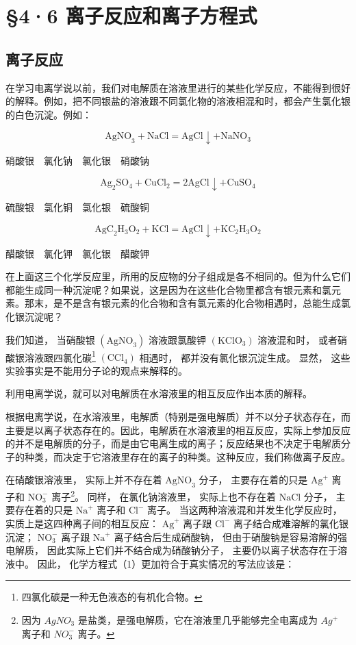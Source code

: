 \section{§4·6 离子反应和离子方程式}

\subsection{离子反应}

在学习电离学说以前，我们对电解质在溶液里进行的某些化学反应，不能得到很好的解释。例如，把不同银盐的溶液跟不同氯化物的溶液相混和时，都会产生氯化银的白色沉淀。例如：

\[
\mathrm{AgNO} _ {3} + \mathrm{NaCl} = \mathrm{AgCl} \downarrow + \mathrm{NaNO} _ {3} \tag {1}
\]

硝酸银　氯化钠　氯化银　硝酸钠

\[
\mathrm{Ag} _ {2} \mathrm{SO} _ {4} + \mathrm{CuCl} _ {2} = 2 \mathrm{AgCl} \downarrow + \mathrm{CuSO} _ {4} \tag {2}
\]

硫酸银　氯化铜　氯化银　硫酸铜

\[
\mathrm{AgC} _ {2} \mathrm{H} _ {3} \mathrm{O} _ {2} + \mathrm{KCl} = \mathrm{AgCl} \downarrow + \mathrm{KC} _ {2} \mathrm{H} _ {3} \mathrm{O} _ {2} \tag {3}
\]

醋酸银　氯化钾　氯化银　醋酸钾

在上面这三个化学反应里，所用的反应物的分子组成是各不相同的。但为什么它们都能生成同一种沉淀呢？如果说，这是因为在这些化合物里都含有银元素和氯元素。那末，是不是含有银元素的化合物和含有氯元素的化合物相遇时，总能生成氯化银沉淀呢？

我们知道， 当硝酸银 \(\left(\mathrm{AgNO}_{3}\right)\) 溶液跟氯酸钾
\(\left(\mathrm{KClO}_{3}\right)\) 溶液混和时，
或者硝酸银溶液跟四氯化碳\footnote{四氯化碳是一种无色液态的有机化合物。}
\(\left(\mathrm{CCl}_{4}\right)\) 相遇时， 都并没有氯化银沉淀生成。
显然， 这些实验事实是不能用分子论的观点来解释的。

利用电离学说，就可以对电解质在水溶液里的相互反应作出本质的解释。

根据电离学说，在水溶液里，电解质（特别是强电解质）并不以分子状态存在，而主要是以离子状态存在的。因此，电解质在水溶液里的相互反应，实际上参加反应的并不是电解质的分子，而是由它电离生成的离子；反应结果也不决定于电解质分子的种类，而决定于它溶液里存在的离子的种类。这种反应，我们称做离子反应。

在硝酸银溶液里， 实际上并不存在着 \(\mathrm{AgNO}_{3}\) 分子，
主要存在着的只是 \(\mathrm{Ag}^{+}\) 离子和 \(\mathrm{NO}_{3}^{-}\)
离子\footnote{因为 \(AgNO_{3}\)
  是盐类，是强电解质，它在溶液里几乎能够完全电离成为 \(Ag^{+}\) 离子和
  \(NO_{3}^{-}\) 离子。}。 同样， 在氯化钠溶液里， 实际上也不存在着
\(\mathrm{NaCl}\) 分子， 主要存在着的只是 \(\mathrm{Na}^{+}\) 离子和
\(\mathrm{Cl}^{-}\) 离子。 当这两种溶液混和并发生化学反应时，
实质上是这四种离子间的相互反应： \(\mathrm{Ag}^{+}\) 离子跟
\(\mathrm{Cl}^{-}\) 离子结合成难溶解的氯化银沉淀；
\(\mathrm{NO}_{3}^{-}\) 离子跟 \(\mathrm{Na}^{+}\)
离子结合后生成硝酸钠， 但由于硝酸钠是容易溶解的强电解质，
因此实际上它们并不结合成为硝酸钠分子， 主要仍以离子状态存在于溶液中。
因此， 化学方程式（1）更加符合于真实情况的写法应该是：

